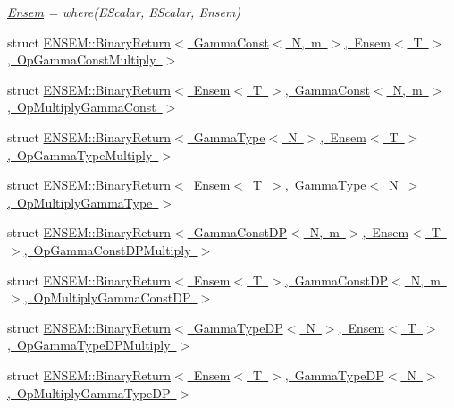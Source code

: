 \begin{DoxyCompactItemize}
\begin{DoxyCompactList}\small\item\em \mbox{\hyperlink{classENSEM_1_1Ensem}{Ensem}} = where(\+E\+Scalar, E\+Scalar, Ensem) \end{DoxyCompactList}\item 
struct \mbox{\hyperlink{structENSEM_1_1BinaryReturn_3_01GammaConst_3_01N_00_01m_01_4_00_01Ensem_3_01T_01_4_00_01OpGammaConstMultiply_01_4}{E\+N\+S\+E\+M\+::\+Binary\+Return$<$ Gamma\+Const$<$ N, m $>$, Ensem$<$ T $>$, Op\+Gamma\+Const\+Multiply $>$}}
\item 
struct \mbox{\hyperlink{structENSEM_1_1BinaryReturn_3_01Ensem_3_01T_01_4_00_01GammaConst_3_01N_00_01m_01_4_00_01OpMultiplyGammaConst_01_4}{E\+N\+S\+E\+M\+::\+Binary\+Return$<$ Ensem$<$ T $>$, Gamma\+Const$<$ N, m $>$, Op\+Multiply\+Gamma\+Const $>$}}
\item 
struct \mbox{\hyperlink{structENSEM_1_1BinaryReturn_3_01GammaType_3_01N_01_4_00_01Ensem_3_01T_01_4_00_01OpGammaTypeMultiply_01_4}{E\+N\+S\+E\+M\+::\+Binary\+Return$<$ Gamma\+Type$<$ N $>$, Ensem$<$ T $>$, Op\+Gamma\+Type\+Multiply $>$}}
\item 
struct \mbox{\hyperlink{structENSEM_1_1BinaryReturn_3_01Ensem_3_01T_01_4_00_01GammaType_3_01N_01_4_00_01OpMultiplyGammaType_01_4}{E\+N\+S\+E\+M\+::\+Binary\+Return$<$ Ensem$<$ T $>$, Gamma\+Type$<$ N $>$, Op\+Multiply\+Gamma\+Type $>$}}
\item 
struct \mbox{\hyperlink{structENSEM_1_1BinaryReturn_3_01GammaConstDP_3_01N_00_01m_01_4_00_01Ensem_3_01T_01_4_00_01OpGammaConstDPMultiply_01_4}{E\+N\+S\+E\+M\+::\+Binary\+Return$<$ Gamma\+Const\+D\+P$<$ N, m $>$, Ensem$<$ T $>$, Op\+Gamma\+Const\+D\+P\+Multiply $>$}}
\item 
struct \mbox{\hyperlink{structENSEM_1_1BinaryReturn_3_01Ensem_3_01T_01_4_00_01GammaConstDP_3_01N_00_01m_01_4_00_01OpMultiplyGammaConstDP_01_4}{E\+N\+S\+E\+M\+::\+Binary\+Return$<$ Ensem$<$ T $>$, Gamma\+Const\+D\+P$<$ N, m $>$, Op\+Multiply\+Gamma\+Const\+D\+P $>$}}
\item 
struct \mbox{\hyperlink{structENSEM_1_1BinaryReturn_3_01GammaTypeDP_3_01N_01_4_00_01Ensem_3_01T_01_4_00_01OpGammaTypeDPMultiply_01_4}{E\+N\+S\+E\+M\+::\+Binary\+Return$<$ Gamma\+Type\+D\+P$<$ N $>$, Ensem$<$ T $>$, Op\+Gamma\+Type\+D\+P\+Multiply $>$}}
\item 
struct \mbox{\hyperlink{structENSEM_1_1BinaryReturn_3_01Ensem_3_01T_01_4_00_01GammaTypeDP_3_01N_01_4_00_01OpMultiplyGammaTypeDP_01_4}{E\+N\+S\+E\+M\+::\+Binary\+Return$<$ Ensem$<$ T $>$, Gamma\+Type\+D\+P$<$ N $>$, Op\+Multiply\+Gamma\+Type\+D\+P $>$}}
\end{DoxyCompactItemize}

